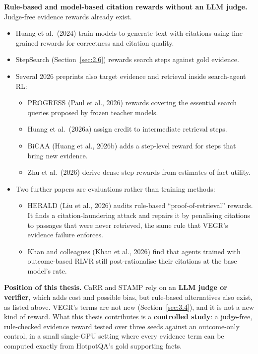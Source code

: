 \textbf{Rule-based and model-based citation rewards without an LLM
judge.} Judge-free evidence rewards already exist.

\begin{itemize}
\tightlist
\item
  Huang et al.~(2024) train models to generate text with citations using
  fine-grained rewards for correctness and citation quality.
\item
  StepSearch (Section~\ref{sec:2.6}) rewards search steps against gold
  evidence.
\item
  Several 2026 preprints also target evidence and retrieval inside
  search-agent RL:

  \begin{itemize}
  \tightlist
  \item
    PROGRESS (Paul et al., 2026) rewards covering the essential search
    queries proposed by frozen teacher models.
  \item
    Huang et al.~(2026a) assign credit to intermediate retrieval steps.
  \item
    BiCAA (Huang et al., 2026b) adds a step-level reward for steps that
    bring new evidence.
  \item
    Zhu et al.~(2026) derive dense step rewards from estimates of fact
    utility.
  \end{itemize}
\item
  Two further papers are evaluations rather than training methods:

  \begin{itemize}
  \tightlist
  \item
    HERALD (Liu et al., 2026) audits rule-based ``proof-of-retrieval''
    rewards. It finds a citation-laundering attack and repairs it by
    penalising citations to passages that were never retrieved, the same
    rule that VEGR's evidence failure enforces.
  \item
    Khan and colleagues (Khan et al., 2026) find that agents trained
    with outcome-based RLVR still post-rationalise their citations at
    the base model's rate.
  \end{itemize}
\end{itemize}

\textbf{Position of this thesis.} CaRR and STAMP rely on an \textbf{LLM
judge or verifier}, which adds cost and possible bias, but rule-based
alternatives also exist, as listed above. VEGR's terms are not new
(Section~\ref{sec:3.4}), and it is not a new kind of reward. What this
thesis contributes is a \textbf{controlled study}: a judge-free,
rule-checked evidence reward tested over three seeds against an
outcome-only control, in a small single-GPU setting where every evidence
term can be computed exactly from HotpotQA's gold supporting facts.

